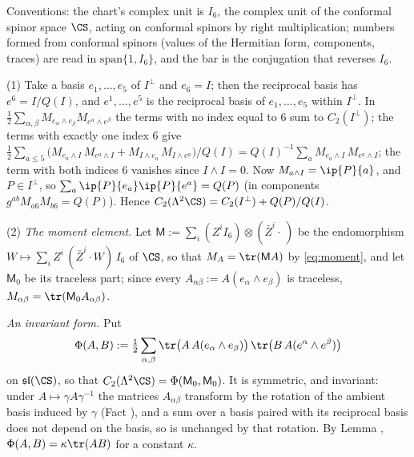 Conventions: the chart's complex unit is $I_{6}$, the complex unit of the conformal spinor space $\CS$, acting on conformal spinors by right multiplication; numbers formed from conformal spinors (values of the Hermitian form, components, traces) are read in $\mathrm{span}\{1, I_{6}\}$, and the bar is the conjugation that reverses $I_{6}$.

(1) Take a basis $e_{1}, \dots, e_{5}$ of $I^{\perp}$ and $e_{6} = I$; then the reciprocal basis has $e^{6} = I/Q(I)$, and $e^{1}, \dots, e^{5}$ is the reciprocal basis of $e_{1}, \dots, e_{5}$ within $I^{\perp}$. In $\tfrac12 \sum_{\alpha,\beta} M_{e_{\alpha}\wedge e_{\beta}}M_{e^{\alpha}\wedge e^{\beta}}$ the terms with no index equal to $6$ sum to $C_{2}(I^{\perp})$; the terms with exactly one index $6$ give $\tfrac12\sum_{a \le 5}\bigl(M_{e_{a}\wedge I}\,M_{e^{a}\wedge I} + M_{I\wedge e_{a}}\,M_{I\wedge e^{a}}\bigr)/Q(I) = Q(I)^{-1}\sum_{a} M_{e_{a}\wedge I}\,M_{e^{a}\wedge I}$; the term with both indices $6$ vanishes since $I \wedge I = 0$. Now $M_{a\wedge I} = \ip{P}{a}$, and $P \in I^{\perp}$, so $\sum_{a}\ip{P}{e_{a}}\ip{P}{e^{a}} = Q(P)$ (in components $g^{ab}M_{a6}M_{b6} = Q(P)$). Hence $C_{2}(\Lambda^{2}\CS) = C_{2}(I^{\perp}) + Q(P)/Q(I)$.

(2) \emph{The moment element.} Let $\mathsf{M} := \sum_{i}(Z^{i}I_{6})\otimes(\bar{Z}^{i}\cdot\,)$ be the endomorphism $W \mapsto \sum_{i}Z^{i}\,(\bar{Z}^{i}\cdot W)\,I_{6}$ of $\CS$, so that $M_{A} = \tr(\mathsf{M}A)$ by \eqref{eq:moment}, and let $\mathsf{M}_{0}$ be its traceless part; since every $A_{\alpha\beta} := A(e_{\alpha}\wedge e_{\beta})$ is traceless, $M_{\alpha\beta} = \tr(\mathsf{M}_{0}A_{\alpha\beta})$.

\emph{An invariant form.} Put
\[
\Phi(A, B) := \tfrac12 \sum_{\alpha,\beta}\tr\bigl(A\,A(e_{\alpha}\wedge e_{\beta})\bigr)\,\tr\bigl(B\,A(e^{\alpha}\wedge e^{\beta})\bigr)
\]
on $\mathfrak{sl}(\CS)$, so that $C_{2}(\Lambda^{2}\CS) = \Phi(\mathsf{M}_{0}, \mathsf{M}_{0})$. It is symmetric, and invariant: under $A \mapsto \gamma A\gamma^{-1}$ the matrices $A_{\alpha\beta}$ transform by the rotation of the ambient basis induced by $\gamma$ (Fact ), and a sum over a basis paired with its reciprocal basis does not depend on the basis, so is unchanged by that rotation. By Lemma , $\Phi(A,B) = \kappa\tr(AB)$ for a constant $\kappa$.

